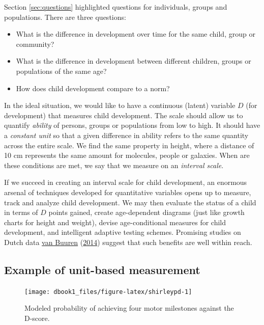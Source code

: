 \documentclass[
]{book}
\begin{document}
Section \ref{sec:questions} highlighted questions for individuals, groups and populations. There are three questions:

\begin{itemize}
\item
  What is the difference in development over time for the same child, group or community?
\item
  What is the difference in development between different children, groups or populations of the same age?
\item
  How does child development compare to a norm?
\end{itemize}

In the ideal situation, we would like to have a continuous (latent) variable \(D\) (for development) that measures child development. The scale should allow us to quantify \emph{ability} of persons, groups or populations from low to high. It should have a \emph{constant unit} so that a given difference in ability refers to the same quantity across the entire scale. We find the same property in height, where a distance of 10 cm represents the same amount for molecules, people or galaxies. When are these conditions are met, we say that we measure on an \emph{interval scale}.

If we succeed in creating an interval scale for child development, an enormous arsenal of techniques developed for quantitative variables opens up to measure, track and analyze child development. We may then evaluate the status of a child in terms of \(D\) points gained, create age-dependent diagrams (just like growth charts for height and weight), devise age-conditional measures for child development, and intelligent adaptive testing schemes. Promising studies on Dutch data \protect\hyperlink{ref-vanbuuren2014}{van Buuren} (\protect\hyperlink{ref-vanbuuren2014}{2014}) suggest that such benefits are well within reach.

\hypertarget{sec:unitbasedexample}{%
\subsection{Example of unit-based measurement}\label{sec:unitbasedexample}}

\begin{figure}

{\centering \texttt{[image: dbook1\_files/figure-latex/shirleypd-1]} 

}

\caption{Modeled probability of achieving four motor milestones against the D-score.}\label{fig:shirleypd}
\end{figure}
\end{document}
